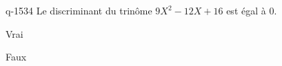 \begin{truefalse}{q-1534}
Le discriminant du trinôme $9X^2-12X+16$ est égal à $0$.
\item Vrai
\item* Faux
\end{truefalse}

